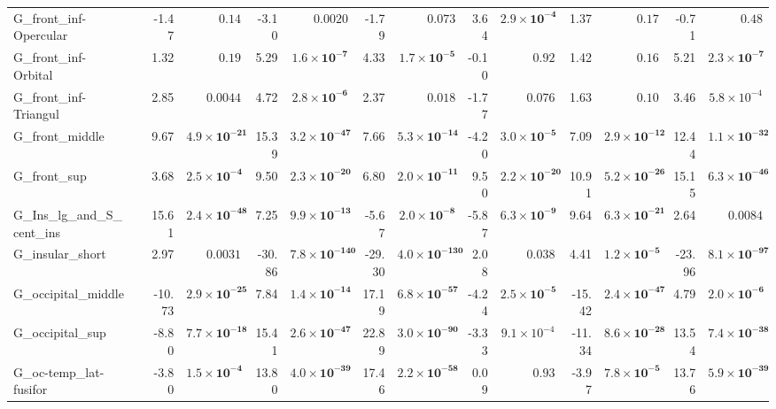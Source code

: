 {\begin{longtable}{llrrrrrrrrrrrr}
G\_front\_inf-Opercular &  & -1.47 & $0.14$ & -3.10 & $0.0020$ & -1.79 & $0.073$ & 3.64 & $\mathbf{2.9{\times}10^{-4}}$ & 1.37 & $0.17$ & -0.71 & $0.48$ \\
G\_front\_inf-Orbital &  & 1.32 & $0.19$ & 5.29 & $\mathbf{1.6{\times}10^{-7}}$ & 4.33 & $\mathbf{1.7{\times}10^{-5}}$ & -0.10 & $0.92$ & 1.42 & $0.16$ & 5.21 & $\mathbf{2.3{\times}10^{-7}}$ \\
G\_front\_inf-Triangul &  & 2.85 & $0.0044$ & 4.72 & $\mathbf{2.8{\times}10^{-6}}$ & 2.37 & $0.018$ & -1.77 & $0.076$ & 1.63 & $0.10$ & 3.46 & $5.8{\times}10^{-4}$ \\
G\_front\_middle &  & 9.67 & $\mathbf{4.9{\times}10^{-21}}$ & 15.39 & $\mathbf{3.2{\times}10^{-47}}$ & 7.66 & $\mathbf{5.3{\times}10^{-14}}$ & -4.20 & $\mathbf{3.0{\times}10^{-5}}$ & 7.09 & $\mathbf{2.9{\times}10^{-12}}$ & 12.44 & $\mathbf{1.1{\times}10^{-32}}$ \\
G\_front\_sup &  & 3.68 & $\mathbf{2.5{\times}10^{-4}}$ & 9.50 & $\mathbf{2.3{\times}10^{-20}}$ & 6.80 & $\mathbf{2.0{\times}10^{-11}}$ & 9.50 & $\mathbf{2.2{\times}10^{-20}}$ & 10.91 & $\mathbf{5.2{\times}10^{-26}}$ & 15.15 & $\mathbf{6.3{\times}10^{-46}}$ \\
G\_Ins\_lg\_and\_S\_cent\_ins &  & 15.61 & $\mathbf{2.4{\times}10^{-48}}$ & 7.25 & $\mathbf{9.9{\times}10^{-13}}$ & -5.67 & $\mathbf{2.0{\times}10^{-8}}$ & -5.87 & $\mathbf{6.3{\times}10^{-9}}$ & 9.64 & $\mathbf{6.3{\times}10^{-21}}$ & 2.64 & $0.0084$ \\
G\_insular\_short &  & 2.97 & $0.0031$ & -30.86 & $\mathbf{7.8{\times}10^{-140}}$ & -29.30 & $\mathbf{4.0{\times}10^{-130}}$ & 2.08 & $0.038$ & 4.41 & $\mathbf{1.2{\times}10^{-5}}$ & -23.96 & $\mathbf{8.1{\times}10^{-97}}$ \\
G\_occipital\_middle &  & -10.73 & $\mathbf{2.9{\times}10^{-25}}$ & 7.84 & $\mathbf{1.4{\times}10^{-14}}$ & 17.19 & $\mathbf{6.8{\times}10^{-57}}$ & -4.24 & $\mathbf{2.5{\times}10^{-5}}$ & -15.42 & $\mathbf{2.4{\times}10^{-47}}$ & 4.79 & $\mathbf{2.0{\times}10^{-6}}$ \\
G\_occipital\_sup &  & -8.80 & $\mathbf{7.7{\times}10^{-18}}$ & 15.41 & $\mathbf{2.6{\times}10^{-47}}$ & 22.89 & $\mathbf{3.0{\times}10^{-90}}$ & -3.33 & $9.1{\times}10^{-4}$ & -11.34 & $\mathbf{8.6{\times}10^{-28}}$ & 13.54 & $\mathbf{7.4{\times}10^{-38}}$ \\
G\_oc-temp\_lat-fusifor &  & -3.80 & $\mathbf{1.5{\times}10^{-4}}$ & 13.80 & $\mathbf{4.0{\times}10^{-39}}$ & 17.46 & $\mathbf{2.2{\times}10^{-58}}$ & 0.09 & $0.93$ & -3.97 & $\mathbf{7.8{\times}10^{-5}}$ & 13.76 & $\mathbf{5.9{\times}10^{-39}}$ \\

\end{longtable}}
